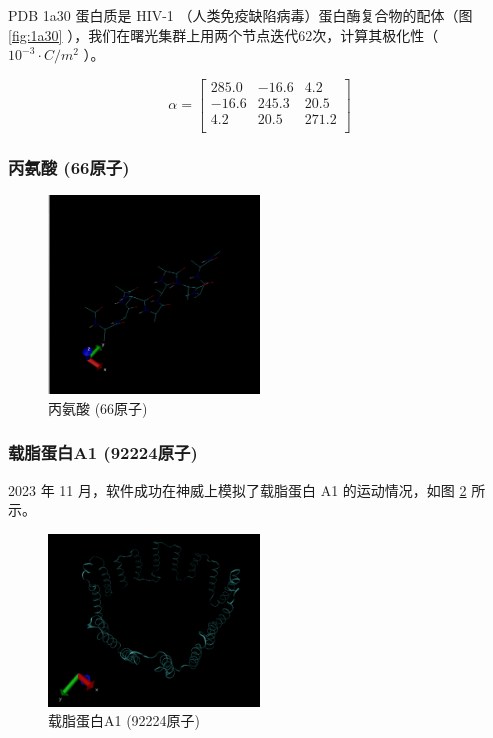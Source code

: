 PDB 1a30 蛋白质是 HIV-1 （人类免疫缺陷病毒）蛋白酶复合物的配体（图 \ref{fig:1a30} ），我们在曙光集群上用两个节点迭代62次，计算其极化性（ $ 10^{-3} \cdot C/m^2$ ）。


\begin{equation}
    \alpha = \begin{bmatrix}
        285.0 & -16.6 & 4.2   \\
        -16.6 & 245.3 & 20.5  \\
        4.2   & 20.5  & 271.2 \\
    \end{bmatrix}
\end{equation}


\subsubsection{丙氨酸 (66原子)}

\begin{figure}[h]
    \centering
    \includegraphics[width=0.5\textwidth]{images/alanin.png}
    \caption{丙氨酸 (66原子)}
    \label{fig:alanin}
\end{figure}

\subsubsection{载脂蛋白A1 (92224原子)}

2023 年 11 月，软件成功在神威上模拟了载脂蛋白 A1 的运动情况，如图 \ref{fig:apoa1} 所示。

\begin{figure}[h]
    \centering
    \includegraphics[width=0.5\textwidth]{images/ApoA1.png}
    \caption{载脂蛋白A1 (92224原子)}
    \label{fig:apoa1}
\end{figure}

